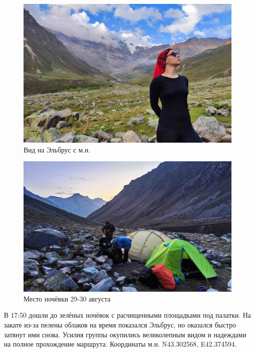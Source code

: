 \begin{figure}[h!]
	\centering
	\includegraphics[width=0.7\linewidth]{../pics/IMG_20240829_181353.jpg}
	\caption{Вид на Эльбрус с м.н.}
	\label{fig:IMG_20240829_184033}
\end{figure}


\begin{figure}[h!]
	\centering
	\includegraphics[width=0.7\linewidth]{../pics/IMG_20240829_191225.jpg}
	\caption{Место ночёвки 29-30 августа}
	\label{fig:IMG_20240829_191225.jpg}
\end{figure}

В 17:50 дошли до зелёных ночёвок с расчищенными площадками под палатки. На закате из-за пелены облаков на время показался Эльбрус, но оказался быстро затянут ими снова. Усилия группы окупились великолепным видом и надеждами на полное прохождение маршрута.
Координаты м.н. N43.302568\degree, E42.374594\degree.


\clearpage